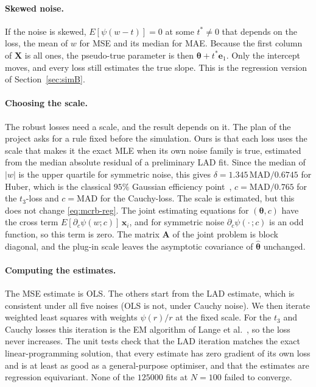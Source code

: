 \documentclass[11pt]{article}
\numberwithin{figure}{section}
\numberwithin{equation}{section}
\begin{document}
\paragraph{Skewed noise.} If the noise is skewed, $E[\psi(w - t)] = 0$ at some $t^* \neq 0$ that depends on the
loss, the mean of $w$ for MSE and its median for MAE. Because the first column of $\mathbf{X}$ is all ones, the
pseudo-true parameter is then $\boldsymbol\theta + t^*\mathbf{e}_1$. Only the intercept moves, and every loss still
estimates the true slope. This is the regression version of Section~\ref{sec:simB}.

\paragraph{Choosing the scale.} The robust losses need a scale, and the result depends on it. The plan
of the project asks for a rule fixed before the simulation. Ours is that each loss uses the scale that
makes it the exact MLE when its own noise family is true, estimated from the median absolute residual
of a preliminary LAD fit. Since the median of $|w|$ is the upper quartile for symmetric noise, this gives
$\delta = 1.345\,\text{MAD}/0.6745$ for Huber, which is the classical $95\%$ Gaussian efficiency
point~\cite{huberronchetti}, $c = \text{MAD}/0.765$ for the $t_3$-loss and $c = \text{MAD}$ for the Cauchy-loss. The
scale is estimated, but this does not change \eqref{eq:mcrb-reg}. The joint estimating equations for
$(\boldsymbol\theta, c)$ have the cross term $E[\partial_c\psi(w; c)]\,\mathbf{x}_i$, and for symmetric noise
$\partial_c\psi(\cdot\,; c)$ is an odd function, so this term is zero. The matrix $\mathbf{A}$ of the joint problem
is block diagonal, and the plug-in scale leaves the asymptotic covariance of $\hat{\boldsymbol\theta}$
unchanged.

\paragraph{Computing the estimates.} The MSE estimate is OLS. The others start from the LAD estimate,
which is consistent under all five noises (OLS is not, under Cauchy noise). We then iterate weighted least
squares with weights $\psi(r)/r$ at the fixed scale. For the $t_3$ and Cauchy losses this iteration is the EM
algorithm of Lange et al.~\cite{lange}, so the loss never increases. The unit tests check that the LAD
iteration matches the exact linear-programming solution, that every estimate has zero gradient of
its own loss and is at least as good as a general-purpose optimiser, and that the estimates are
regression equivariant. None of the $125000$ fits at $N = 100$ failed to converge.
\end{document}
